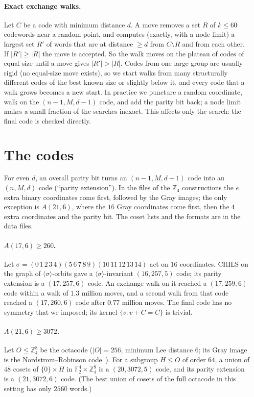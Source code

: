 \documentclass[11pt]{article}
\newcommand{\F}{\mathbb{F}_2}
\newcommand{\Z}{\mathbb{Z}_4}
\begin{document}
\paragraph{Exact exchange walks.} Let $C$ be a code with minimum distance $d$. A move removes a set $R$ of $k\le60$
codewords near a random point, and computes (exactly, with a node limit) a largest set $R'$ of words that are at distance
$\ge d$ from $C\setminus R$ and from each other. If $|R'|\ge|R|$ the move is accepted. So the walk moves on the plateau
of codes of equal size until a move gives $|R'|>|R|$. Codes from one large group are usually rigid (no equal-size move
exists), so we start walks from many structurally different codes of the best known size or slightly below it, and every
code that a walk grows becomes a new start. In practice we puncture a random coordinate, walk on the $(n-1,M,d-1)$
code, and add the parity bit back; a node limit makes a small fraction of the searches inexact. This affects only the
search: the final code is checked directly.

\section{The codes}

For even $d$, an overall parity bit turns an $(n-1,M,d-1)$ code into an $(n,M,d)$ code (``parity extension'').
In the files of the $\Z$ constructions the $e$ extra binary coordinates come first, followed by the Gray images;
the only exception is $A(21,6)$, where the $16$ Gray coordinates come first, then the $4$ extra coordinates and the
parity bit. The coset lists and the formats are in the data files.

\paragraph{$A(17,6)\ge260$.} Let $\sigma=(0\,1\,2\,3\,4)(5\,6\,7\,8\,9)(10\,11\,12\,13\,14)$ act on $16$ coordinates.
CHILS on the graph of $\langle\sigma\rangle$-orbits gave a $\langle\sigma\rangle$-invariant $(16,257,5)$ code; its parity
extension is a $(17,257,6)$ code. An exchange walk on it reached a $(17,259,6)$ code within a walk of $1.3$ million moves,
and a second walk from that code reached a $(17,260,6)$ code after $0.77$ million moves. The final code has no symmetry that we
imposed; its kernel $\{v: v+C=C\}$ is trivial.

\paragraph{$A(21,6)\ge3072$.} Let $O\le\Z^8$ be the octacode ($|O|=256$, minimum Lee distance $6$; its Gray image is the
Nordstrom--Robinson code~\cite{HKCSS}). For a subgroup $H\le O$ of order $64$, a union of $48$ cosets of $\{0\}\times H$
in $\F^4\times\Z^8$ is a $(20,3072,5)$ code, and its parity extension is a $(21,3072,6)$ code. (The best union of
cosets of the full octacode in this setting has only $2560$ words.)
\end{document}
